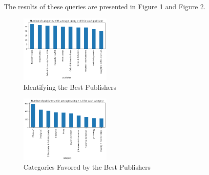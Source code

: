 The results of these queries are presented in Figure \ref{fig:h6_which_best} and Figure \ref{fig:h6_where_best}.

\begin{figure}[H]
    \centering
    \includegraphics[width=0.4\textwidth]{./figures/h6_which_best.png}
    \caption{Identifying the Best Publishers}
    \label{fig:h6_which_best}
\end{figure}

\begin{figure}[H]
    \centering
    \includegraphics[width=0.4\textwidth]{./figures/h6_where_best.png}
    \caption{Categories Favored by the Best Publishers}
    \label{fig:h6_where_best}
\end{figure}
